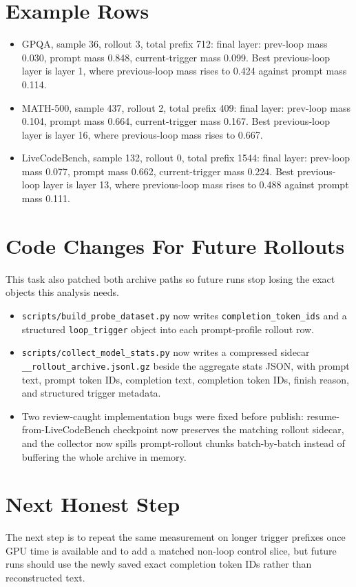 \documentclass[11pt]{article}
\begin{document}
\section*{Example Rows}

\begin{itemize}
  \item GPQA, sample 36, rollout 3, total prefix 712:
  final layer: prev-loop mass 0.030, prompt mass 0.848, current-trigger mass 0.099. Best previous-loop layer is layer 1, where previous-loop mass rises to 0.424 against prompt mass 0.114.
  \item MATH-500, sample 437, rollout 2, total prefix 409:
  final layer: prev-loop mass 0.104, prompt mass 0.664, current-trigger mass 0.167. Best previous-loop layer is layer 16, where previous-loop mass rises to 0.667.
  \item LiveCodeBench, sample 132, rollout 0, total prefix 1544:
  final layer: prev-loop mass 0.077, prompt mass 0.662, current-trigger mass 0.224. Best previous-loop layer is layer 13, where previous-loop mass rises to 0.488 against prompt mass 0.111.
\end{itemize}

\section*{Code Changes For Future Rollouts}

This task also patched both archive paths so future runs stop losing the exact objects this analysis needs.

\begin{itemize}
  \item \texttt{scripts/build\_probe\_dataset.py} now writes \texttt{completion\_token\_ids} and a structured \texttt{loop\_trigger} object into each prompt-profile rollout row.
  \item \texttt{scripts/collect\_model\_stats.py} now writes a compressed sidecar
  \texttt{\_\_rollout\_archive.jsonl.gz} beside the aggregate stats JSON, with prompt text, prompt token IDs, completion text, completion token IDs, finish reason, and structured trigger metadata.
  \item Two review-caught implementation bugs were fixed before publish: resume-from-LiveCodeBench checkpoint now preserves the matching rollout sidecar, and the collector now spills prompt-rollout chunks batch-by-batch instead of buffering the whole archive in memory.
\end{itemize}

\section*{Next Honest Step}

The next step is to repeat the same measurement on longer trigger prefixes once GPU time is available and to add a matched non-loop control slice, but future runs should use the newly saved exact completion token IDs rather than reconstructed text.
\end{document}
